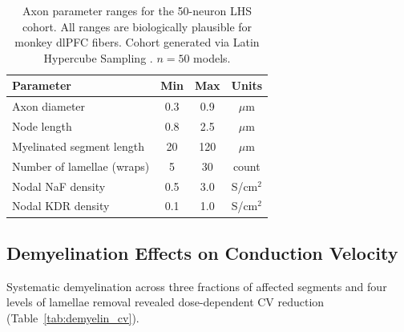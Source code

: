 \documentclass[11pt]{article}
\begin{document}
\begin{table}[H]
\centering
\caption{Axon parameter ranges for the 50-neuron LHS cohort. All ranges are biologically plausible for monkey dlPFC fibers. Cohort generated via Latin Hypercube Sampling \citep{mckay1979comparison}. $n = 50$ models.}
\label{tab:lhs_params}
\begin{tabular}{lccc}
\toprule
\textbf{Parameter} & \textbf{Min} & \textbf{Max} & \textbf{Units} \\
\midrule
Axon diameter & 0.3 & 0.9 & $\mu$m \\
Node length & 0.8 & 2.5 & $\mu$m \\
Myelinated segment length & 20 & 120 & $\mu$m \\
Number of lamellae (wraps) & 5 & 30 & count \\
Nodal NaF density & 0.5 & 3.0 & S/cm$^2$ \\
Nodal KDR density & 0.1 & 1.0 & S/cm$^2$ \\
\bottomrule
\end{tabular}
\end{table}

\subsection{Demyelination Effects on Conduction Velocity}

Systematic demyelination across three fractions of affected segments and four levels of lamellae removal revealed dose-dependent CV reduction (Table~\ref{tab:demyelin_cv}).
\end{document}
